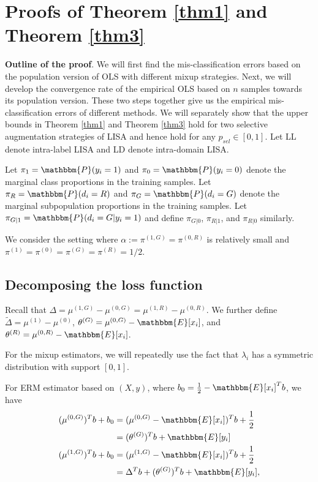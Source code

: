\renewcommand{\baselinestretch}{1.0}

\def\R{\mathbbm{R}}
\def\P{\mathbbm{P}}
\def\E{\mathbbm{E}}
\def\lam{\lambda}
\def\Sig{\Sigma}
\def\gam{\gamma}
\def\tx{\tilde{x}}
\def\ty{\tilde{y}}
\section{Proofs of Theorem \ref{thm1} and Theorem \ref{thm3}}
\label{sec:app_proof}
\textbf{Outline of the proof}. We will first find the mis-classification errors based on the population version of OLS with different mixup strategies. Next, we will develop the convergence rate of the empirical OLS based on $n$ samples towards its population version. These two steps together give us the empirical mis-classification errors of different methods. We will separately show that the upper bounds in Theorem \ref{thm1} and Theorem \ref{thm3} hold for two selective augmentation strategies of LISA and hence hold for any $p_{sel}\in[0,1]$. Let LL denote intra-label LISA and LD denote intra-domain LISA.

Let $\pi_1=\P(y_i=1)$ and $\pi_0=\P(y_i=0)$ denote the marginal class proportions in the training samples. Let $\pi_R=\P(d_i=R)$ and $\pi_G=\P(d_i=G)$ denote the marginal subpopulation proportions in the training samples. Let $\pi_{G|1}=\P(d_i=G|y_i=1)$ and define $\pi_{G|0}$, $\pi_{R|1}$, and $\pi_{R|0}$ similarly.

We consider the setting where $\alpha:=\pi^{(1,G)}=\pi^{(0,R)}$ is relatively small and $\pi^{(1)}=\pi^{(0)}=\pi^{(G)}=\pi^{(R)}=1/2$.

\subsection{Decomposing the loss function}
Recall that $\Delta=\mu^{(1,G)}-\mu^{(0,G)}=\mu^{(1,R)}-\mu^{(0,R)}$. We further define $\widetilde{\Delta}=\mu^{(1)}-\mu^{(0)}$, $\theta^{(G)}=\mu^{(0,G)}-\E[x_i]$, and $\theta^{(R)}=\mu^{(0,R)}-\E[x_i]$.

For the mixup estimators, we will repeatedly use the fact that $\lam_i$ has a symmetric distribution with support $[0,1]$.

For ERM estimator based on $(X,y)$, where $b_0=\frac{1}{2}-\E[x_i]^Tb$, we have
\begin{align*}
(\mu^{(0,G)})^Tb+b_0&=(\mu^{(0,G)}-\E[x_i])^Tb+\frac{1}{2}\\
&=(\theta^{(G)})^Tb+\E[y_i]\\
(\mu^{(1,G)})^Tb+b_0&=(\mu^{(1,G)}-\E[x_i])^Tb+\frac{1}{2}\\
&=\Delta^Tb+(\theta^{(G)})^Tb+\E[y_i],
\end{align*}

